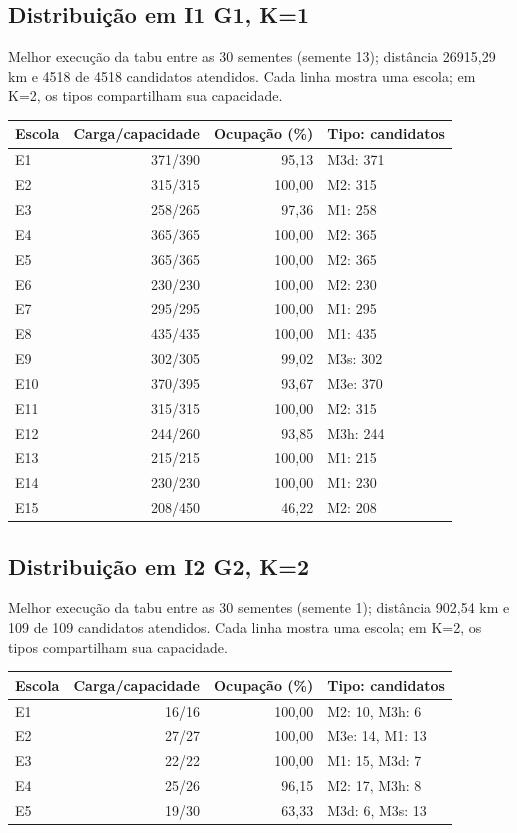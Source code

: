 \subsection{Distribuição em I1 G1, K=1}
Melhor execução da tabu entre as 30 sementes (semente 13); distância 26915,29 km e 4518 de 4518 candidatos atendidos. Cada linha mostra uma escola; em K=2, os tipos compartilham sua capacidade.
\begin{center}\small\begin{tabular}{lrrl}
\toprule Escola & Carga/capacidade & Ocupação (\%) & Tipo: candidatos\\\midrule
E1 & 371/390 & 95,13 & M3d: 371 \\
E2 & 315/315 & 100,00 & M2: 315 \\
E3 & 258/265 & 97,36 & M1: 258 \\
E4 & 365/365 & 100,00 & M2: 365 \\
E5 & 365/365 & 100,00 & M2: 365 \\
E6 & 230/230 & 100,00 & M2: 230 \\
E7 & 295/295 & 100,00 & M1: 295 \\
E8 & 435/435 & 100,00 & M1: 435 \\
E9 & 302/305 & 99,02 & M3s: 302 \\
E10 & 370/395 & 93,67 & M3e: 370 \\
E11 & 315/315 & 100,00 & M2: 315 \\
E12 & 244/260 & 93,85 & M3h: 244 \\
E13 & 215/215 & 100,00 & M1: 215 \\
E14 & 230/230 & 100,00 & M1: 230 \\
E15 & 208/450 & 46,22 & M2: 208 \\
\bottomrule\end{tabular}\end{center}
\subsection{Distribuição em I2 G2, K=2}
Melhor execução da tabu entre as 30 sementes (semente 1); distância 902,54 km e 109 de 109 candidatos atendidos. Cada linha mostra uma escola; em K=2, os tipos compartilham sua capacidade.
\begin{center}\small\begin{tabular}{lrrl}
\toprule Escola & Carga/capacidade & Ocupação (\%) & Tipo: candidatos\\\midrule
E1 & 16/16 & 100,00 & M2: 10, M3h: 6 \\
E2 & 27/27 & 100,00 & M3e: 14, M1: 13 \\
E3 & 22/22 & 100,00 & M1: 15, M3d: 7 \\
E4 & 25/26 & 96,15 & M2: 17, M3h: 8 \\
E5 & 19/30 & 63,33 & M3d: 6, M3s: 13 \\
\bottomrule\end{tabular}\end{center}